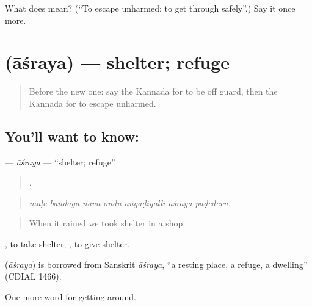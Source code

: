 \begin{tcolorbox}[breakable,colback=teal!4,colframe=teal!35!black,title={Before you move on}]
What does  mean? (\textquotedblleft{}To escape unharmed; to get through safely\textquotedblright{}.) Say it once more.
\end{tcolorbox}
\section[\texorpdfstring{\kn{ಆಶ್ರಯ} (āśraya)}{ಆಶ್ರಯ (āśraya)}]{ (āśraya) — shelter; refuge}

\label{lesson:KA-C472-asraya}



\begin{quote}
Before the new one: say the Kannada for to be off guard, then the Kannada for to escape unharmed.
\end{quote}

\subsection*{You'll want to know: }
\textbf{} — \emph{āśraya} — \textquotedblleft{}shelter; refuge\textquotedblright{}.

\begin{quote}
      .
\end{quote}

\begin{quote}
\emph{maḷe bandāga nāvu ondu aṅgaḍiyalli āśraya paḍedevu.}
\end{quote}

\begin{quote}
When it rained we took shelter in a shop.
\end{quote}

 , to take shelter;  , to give shelter.

\begin{cousinweb}
\textbf{} (\emph{āśraya}) is borrowed from Sanskrit \emph{āśraya}, \textquotedblleft{}a resting place, a refuge, a dwelling\textquotedblright{} (CDIAL 1466).
\end{cousinweb}

\begin{grammarlens}[title={What you've built}]
One more word for getting around.
\end{grammarlens}

